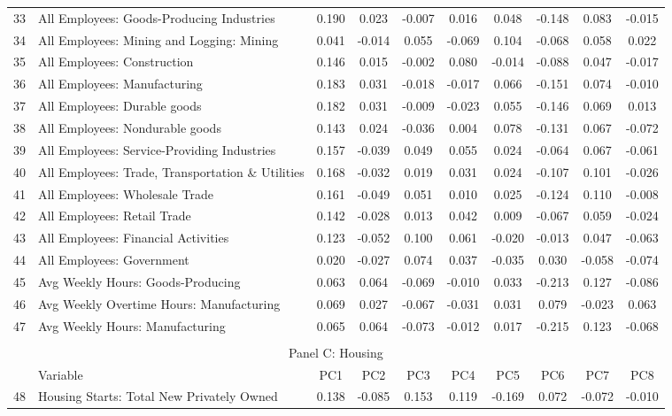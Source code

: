 \begin{table}[!h]
\begin{tabular}{llcccccccc}
33&All Employees: Goods-Producing Industries	&	0.190	&	0.023	&	-0.007	&	0.016	&	0.048	&	-0.148	&	0.083	&	-0.015	\\
34&All Employees: Mining and Logging: Mining	&	0.041	&	-0.014	&	0.055	&	-0.069	&	0.104	&	-0.068	&	0.058	&	0.022	\\
35&All Employees: Construction	&	0.146	&	0.015	&	-0.002	&	0.080	&	-0.014	&	-0.088	&	0.047	&	-0.017	\\
36&All Employees: Manufacturing	&	0.183	&	0.031	&	-0.018	&	-0.017	&	0.066	&	-0.151	&	0.074	&	-0.010	\\
37&All Employees: Durable goods	&	0.182	&	0.031	&	-0.009	&	-0.023	&	0.055	&	-0.146	&	0.069	&	0.013	\\
38&All Employees: Nondurable goods	&	0.143	&	0.024	&	-0.036	&	0.004	&	0.078	&	-0.131	&	0.067	&	-0.072	\\
39&All Employees: Service-Providing Industries	&	0.157	&	-0.039	&	0.049	&	0.055	&	0.024	&	-0.064	&	0.067	&	-0.061	\\
40&All Employees: Trade, Transportation \& Utilities	&	0.168	&	-0.032	&	0.019	&	0.031	&	0.024	&	-0.107	&	0.101	&	-0.026	\\
41&All Employees: Wholesale Trade	&	0.161	&	-0.049	&	0.051	&	0.010	&	0.025	&	-0.124	&	0.110	&	-0.008	\\
42&All Employees: Retail Trade	&	0.142	&	-0.028	&	0.013	&	0.042	&	0.009	&	-0.067	&	0.059	&	-0.024	\\
43&All Employees: Financial Activities	&	0.123	&	-0.052	&	0.100	&	0.061	&	-0.020	&	-0.013	&	0.047	&	-0.063	\\
44&All Employees: Government	&	0.020	&	-0.027	&	0.074	&	0.037	&	-0.035	&	0.030	&	-0.058	&	-0.074	\\
45&Avg Weekly Hours: Goods-Producing	&	0.063	&	0.064	&	-0.069	&	-0.010	&	0.033	&	-0.213	&	0.127	&	-0.086	\\
46&Avg Weekly Overtime Hours: Manufacturing	&	0.069	&	0.027	&	-0.067	&	-0.031	&	0.031	&	0.079	&	-0.023	&	0.063	\\
47&Avg Weekly Hours: Manufacturing	&	0.065	&	0.064	&	-0.073	&	-0.012	&	0.017	&	-0.215	&	0.123	&	-0.068	\\
\\ \hline
 \multicolumn{10}{c}{Panel C: Housing} \\ 
&Variable&	PC1	&	PC2	&	PC3	&	PC4	&	PC5	&	PC6	&	PC7	&	PC8	\\ \hline
48&Housing Starts: Total New Privately Owned	&	0.138	&	-0.085	&	0.153	&	0.119	&	-0.169	&	0.072	&	-0.072	&	-0.010	\\

\end{tabular}
\end{table}
